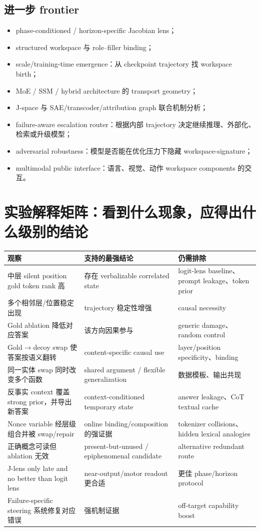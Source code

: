 \documentclass[10.5pt,a4paper]{ctexart}
\begin{document}
\subsection{进一步 frontier}
\begin{itemize}
  \item phase-conditioned / horizon-specific Jacobian lens；
  \item structured workspace 与 role--filler binding；
  \item scale/training-time emergence：从 checkpoint trajectory 找 workspace birth；
  \item MoE / SSM / hybrid architecture 的 transport geometry；
  \item J-space 与 SAE/transcoder/attribution graph 联合机制分析；
  \item failure-aware escalation router：根据内部 trajectory 决定继续推理、外部化、检索或升级模型；
  \item adversarial robustness：模型是否能在优化压力下隐藏 workspace-signature；
  \item multimodal public interface：语言、视觉、动作 workspace components 的交互。
\end{itemize}

\section{实验解释矩阵：看到什么现象，应得出什么级别的结论}
\begin{longtable}{p{}p{}p{}}
\toprule
观察 & 支持的最强结论 & 仍需排除 \\
\midrule
中层 silent position gold token rank 高 & 存在 verbalizable correlated state & logit-lens baseline、prompt leakage、token prior \\
多个相邻层/位置稳定出现 & trajectory 稳定性增强 & causal necessity \\
Gold ablation 降低对应答案 & 该方向因果参与 & generic damage、random control \\
Gold$\to$decoy swap 使答案按语义翻转 & content-specific causal use & layer/position specificity、binding \\
同一实体 swap 同时改变多个函数 & shared argument / flexible generalization & 数据模板、输出共现 \\
反事实 context 覆盖 strong prior，并导出新答案 & context-conditioned temporary state & answer leakage、CoT textual cache \\
Nonce variable 经层级组合并被 swap/repair & online binding/composition 的强证据 & tokenizer collisions、hidden lexical analogies \\
正确概念可读但 ablation 无效 & present-but-unused / epiphenomenal candidate & alternative redundant route \\
J-lens only late and no better than logit lens & near-output/motor readout 更合适 & 更佳 phase/horizon protocol \\
Failure-specific steering 系统修复对应错误 & 强机制证据 & off-target capability boost \\
\bottomrule
\end{longtable}
\end{document}
